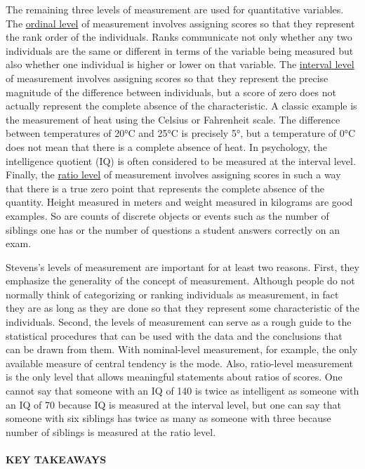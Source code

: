 \documentclass[
]{krantz}
\begin{document}
The remaining three levels of measurement are used for quantitative variables. The \hyperref[ordinal-level]{ordinal level} of measurement involves assigning scores so that they represent the rank order of the individuals. Ranks communicate not only whether any two individuals are the same or different in terms of the variable being measured but also whether one individual is higher or lower on that variable. The \hyperref[interval-level]{interval level} of measurement involves assigning scores so that they represent the precise magnitude of the difference between individuals, but a score of zero does not actually represent the complete absence of the characteristic. A classic example is the measurement of heat using the Celsius or Fahrenheit scale. The difference between temperatures of 20°C and 25°C is precisely 5°, but a temperature of 0°C does not mean that there is a complete absence of heat. In psychology, the intelligence quotient (IQ) is often considered to be measured at the interval level. Finally, the \hyperref[ratio-level]{ratio level} of measurement involves assigning scores in such a way that there is a true zero point that represents the complete absence of the quantity. Height measured in meters and weight measured in kilograms are good examples. So are counts of discrete objects or events such as the number of siblings one has or the number of questions a student answers correctly on an exam.

Stevens's levels of measurement are important for at least two reasons. First, they emphasize the generality of the concept of measurement. Although people do not normally think of categorizing or ranking individuals as measurement, in fact they are as long as they are done so that they represent some characteristic of the individuals. Second, the levels of measurement can serve as a rough guide to the statistical procedures that can be used with the data and the conclusions that can be drawn from them. With nominal-level measurement, for example, the only available measure of central tendency is the mode. Also, ratio-level measurement is the only level that allows meaningful statements about ratios of scores. One cannot say that someone with an IQ of 140 is twice as intelligent as someone with an IQ of 70 because IQ is measured at the interval level, but one can say that someone with six siblings has twice as many as someone with three because number of siblings is measured at the ratio level.

\paragraph*{KEY TAKEAWAYS}\label{key-takeaways-9}
\end{document}
